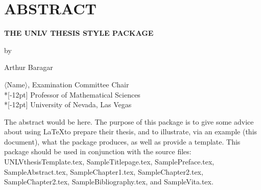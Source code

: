 \chapter*{ABSTRACT}

\begin{center}
\textbf{THE UNLV THESIS STYLE PACKAGE}

by

Arthur Baragar

 $\langle$Name$\rangle$, Examination Committee
 Chair\\*[-12pt]%
 Professor of Mathematical Sciences \\*[-12pt]
 University of Nevada, Las Vegas  %
 \end{center}

The abstract would be here.  The purpose of this package is to
give some advice about using \LaTeX to prepare their thesis, and
to illustrate, via an example (this document), what the package
produces, as well as provide a template.  This package should be
used in conjunction with the source files: UNLVthesisTemplate.tex,
SampleTitlepage.tex, SamplePreface.tex, SampleAbstract.tex,
SampleChapter1.tex, SampleChapter2.tex, SampleChapter2.tex,
SampleBibliography.tex, and SampleVita.tex.
